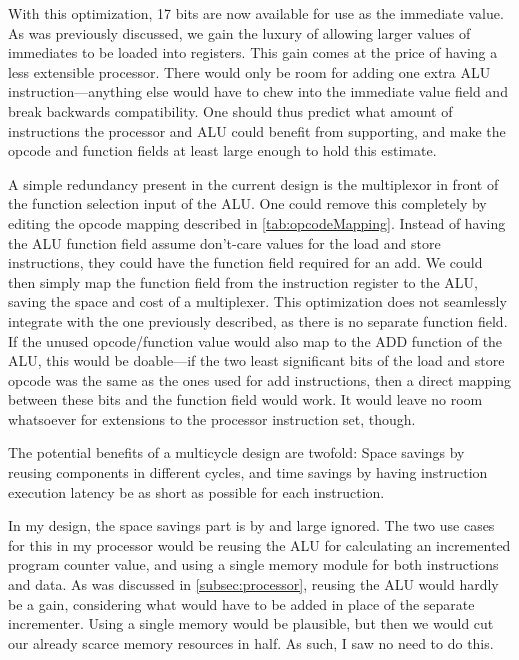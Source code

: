 \documentclass[11pt]{article}
\begin{document}
With this optimization, 17 bits are now available for use as the
immediate value. As was previously discussed, we gain the luxury of
allowing larger values of immediates to be loaded into registers. This
gain comes at the price of having a less extensible processor. There
would only be room for adding one extra ALU instruction---anything
else would have to chew into the immediate value field and break
backwards compatibility. One should thus predict what amount of
instructions the processor and ALU could benefit from supporting, and
make the opcode and function fields at least large enough to hold this
estimate.\newline

A simple redundancy present in the current design is the multiplexor
in front of the function selection input of the ALU. One could remove
this completely by editing the opcode mapping described in
\autoref{tab:opcodeMapping}. Instead of having the ALU function field
assume don't-care values for the load and store instructions, they
could have the function field required for an add. We could then
simply map the function field from the instruction register to the
ALU, saving the space and cost of a multiplexer. This optimization
does not seamlessly integrate with the one previously described, as
there is no separate function field. If the unused opcode/function
value would also map to the ADD function of the ALU, this would be
doable---if the two least significant bits of the load and store
opcode was the same as the ones used for add instructions, then a
direct mapping between these bits and the function field would
work. It would leave no room whatsoever for extensions to the
processor instruction set, though.\newline

The potential benefits of a multicycle design are twofold: Space
savings by reusing components in different cycles, and time savings by
having instruction execution latency be as short as possible for each
instruction. 

In my design, the space savings part is by and large
ignored. The two use cases for this in my processor would be reusing
the ALU for calculating an incremented program counter value, and
using a single memory module for both instructions and data. As was
discussed in \autoref{subsec:processor}, reusing the ALU would hardly
be a gain, considering what would have to be added in place of the
separate incrementer. Using a single memory would be plausible, but
then we would cut our already scarce memory resources in half. As
such, I saw no need to do this. 
\end{document}
